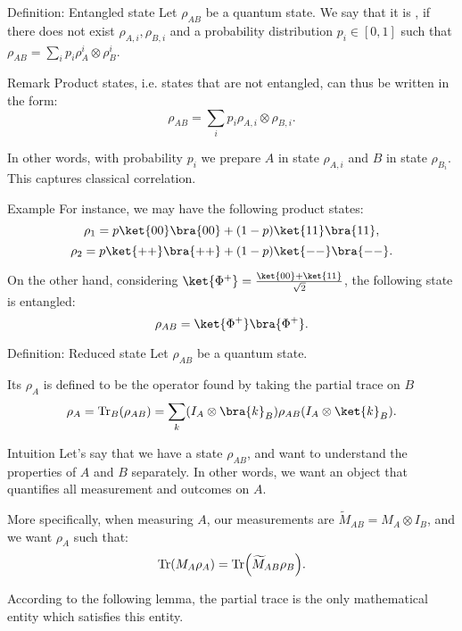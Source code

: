 \documentclass[a4paper]{article}
\begin{document}
\begin{parag}{Definition: Entangled state}
    Let $\rho_{AB}$ be a quantum state. We say that it is , if there does not exist $\rho_{A,i}, \rho_{B,i}$ and a probability distribution $p_i \in \left[0,1\right]$ such that $\rho_{AB} = \sum_{i} p_i \rho_A^i \otimes \rho_B^i$.

    \begin{subparag}{Remark}
        Product states, i.e. states that are not entangled, can thus be written in the form:
        \[\rho_{AB} = \sum_{i} p_i \rho_{A,i} \otimes \rho_{B,i}.\]

        In other words, with probability $p_i$ we prepare $A$ in state $\rho_{A,i}$ and $B$ in state $\rho_{B_i}$. This captures classical correlation.
    \end{subparag}
    
    \begin{subparag}{Example}
        For instance, we may have the following product states: 
        \[\rho_1 = p \ket{00} \bra{00} + \left(1-p\right) \ket{11}\bra{11},\]
        \[\rho_2 = p \ket{++}\bra{++} + \left(1-p\right) \ket{--}\bra{--}.\]

        On the other hand, considering $\ket{\Phi^+} = \frac{\ket{00} + \ket{11}}{\sqrt{2}}$, the following state is entangled: 
        \[\rho_{AB} = \ket{\Phi^+} \bra{\Phi^+}.\]
    \end{subparag}
\end{parag}

\begin{parag}{Definition: Reduced state}
    Let $\rho_{AB}$ be a quantum state. 

    Its  $\rho_A$ is defined to be the operator found by taking the partial trace on $B$
    \[\rho_A = \Tr_B\left(\rho_{AB}\right) = \sum_{k} \left(I_A \otimes \bra{k}_B\right) \rho_{AB} \left(I_A \otimes \ket{k}_B\right).\]

    \begin{subparag}{Intuition}
        Let's say that we have a state $\rho_{AB}$, and want to understand the properties of $A$ and $B$ separately. In other words, we want an object that quantifies all measurement and outcomes on $A$.

        More specifically, when measuring $A$, our measurements are $\widetilde{M}_{AB} = M_A \otimes I_B$, and we want $\rho_A$ such that: 
        \[\Tr\left(M_A \rho_A\right) = \Tr\left(\widetilde{M}_{AB} \rho_B\right).\]

        According to the following lemma, the partial trace is the only mathematical entity which satisfies this entity.
    \end{subparag}
\end{parag}
\end{document}
